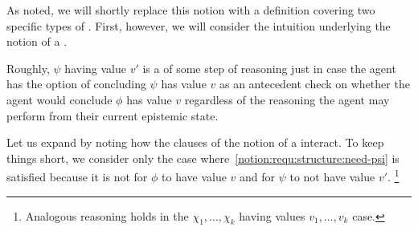 \begin{note}
  As noted, we will shortly replace this notion with a definition covering two specific types of \requ{}.
  First, however, we will consider the intuition underlying the notion of a \requ{}.

  Roughly, \(\psi\) having value \(v'\) is a \requ{} of some step of reasoning just in case the agent has the option of concluding \(\psi\) has value \(v\) as an antecedent check on whether the agent would conclude \(\phi\) has value \(v\) regardless of the reasoning the agent may perform from their current epistemic state.
\end{note}

\begin{note}[Expanding]
  Let us expand by noting how the clauses of the notion of a \requ{} interact.
  To keep things short, we consider only the case where~\ref{notion:requ:structure:need-psi} is satisfied because it is not \epVAd{} for \(\phi\) to have value \(v\) and for \(\psi\) to not have value \(v'\).\nolinebreak
  \footnote{
    Analogous reasoning holds in the \(\chi_{1},\dots,\chi_{k}\) having values \(v_{1},\dots,v_{k}\) case.
  }
\end{note}

